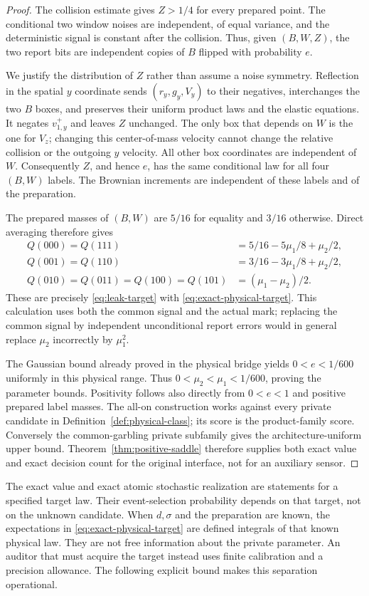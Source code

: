 \begin{proof}
The collision estimate gives $Z>1/4$ for every prepared point.
The conditional two window noises are independent, of equal variance,
and the deterministic signal is constant after the collision. Thus,
given $(B,W,Z)$, the two report bits are independent copies of $B$
flipped with probability $e$.

We justify the distribution of $Z$ rather than assume a noise symmetry.
Reflection in the spatial $y$ coordinate sends
$(r_y,g_y,V_y)$ to their negatives, interchanges the two $B$ boxes,
and preserves their uniform product laws and the elastic equations.
It negates $v_{1,y}^{+}$ and leaves $Z$ unchanged. The only box that
depends on $W$ is the one for $V_z$; changing this center-of-mass
velocity cannot change the relative collision or the outgoing
$y$ velocity. All other box coordinates are independent of $W$.
Consequently $Z$, and hence $e$, has the same conditional law for all
four $(B,W)$ labels. The Brownian increments are independent of these
labels and of the preparation.

The prepared masses of $(B,W)$ are $5/16$ for equality and $3/16$
otherwise. Direct averaging therefore gives
\begin{align*}
 Q(000)=Q(111)&=5/16-5\mu_1/8+\mu_2/2,\\
 Q(001)=Q(110)&=3/16-3\mu_1/8+\mu_2/2,\\
 Q(010)=Q(011)=Q(100)=Q(101)&=(\mu_1-\mu_2)/2.
\end{align*}
These are precisely \eqref{eq:leak-target} with
\eqref{eq:exact-physical-target}. This calculation uses both the common
signal and the actual mark; replacing the common signal by independent
unconditional report errors would in general replace $\mu_2$ incorrectly
by $\mu_1^2$.

The Gaussian bound already proved in the physical bridge yields
$0<e<1/600$ uniformly in this physical range. Thus
$0<\mu_2<\mu_1<1/600$, proving the parameter bounds. Positivity follows
also directly from $0<e<1$ and positive prepared label masses.
The all-on construction works against every private candidate in
Definition~\ref{def:physical-class}; its score is the product-family
score. Conversely the common-garbling private subfamily gives the
architecture-uniform upper bound. Theorem~\ref{thm:positive-saddle}
therefore supplies both exact value and exact decision count for the
original interface, not for an auxiliary sensor.
\end{proof}

\begin{remark}
The exact value and exact atomic stochastic realization are statements
for a specified target law. Their event-selection probability depends
on that target, not on the unknown candidate. When $d,\sigma$ and the
preparation are known, the expectations in
\eqref{eq:exact-physical-target} are defined integrals of that known
physical law. They are not free information about the private parameter.
An auditor that must acquire the target instead uses finite calibration
and a precision allowance. The following explicit bound makes this
separation operational.
\end{remark}

